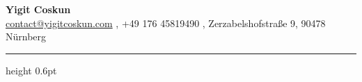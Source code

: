 
\begin{center}
    {\rmfamily\bfseries\huge Yigit Coskun} \\[6pt]
    {\footnotesize\color{meta}
    \href{mailto:contact@yigitcoskun.com}{contact@yigitcoskun.com} \sep
    +49 176 45819490 \sep
    Zerzabelshofstraße 9, 90478 Nürnberg}
\end{center}

\vspace{-4pt}
{\color{accent}\hrule height 0.6pt}
\vspace{16pt}
